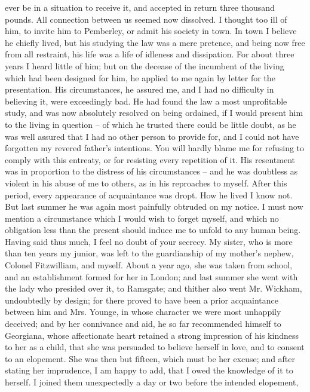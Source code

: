 \begin{letter}
ever be in a situation to receive it, and accepted in return
three thousand pounds. All connection between us
seemed now dissolved. I thought too ill of him, to invite
him to Pemberley, or admit his society in town. In town
I believe he chiefly lived, but his studying the law was
a mere pretence, and being now free from all restraint,
his life was a life of idleness and dissipation. For about
three years I heard little of him; but on the decease
of the incumbent of the living which had been designed
for him, he applied to me again by letter for the presentation.
His circumstances, he assured me, and I had no
difficulty in believing it, were exceedingly bad. He had
found the law a most unprofitable study, and was now
absolutely resolved on being ordained, if I would present
him to the living in question -- of which he trusted there
could be little doubt, as he was well assured that I had
no other person to provide for, and I could not have
forgotten my revered father’s intentions. You will hardly
blame me for refusing to comply with this entreaty, or
for resisting every repetition of it. His resentment was
in proportion to the distress of his circumstances -- and
he was doubtless as violent in his abuse of me to others,
as in his reproaches to myself. After this period, every
appearance of acquaintance was dropt. How he lived
I know not. But last summer he was again most painfully
obtruded on my notice. I must now mention a circumstance
which I would wish to forget myself, and which
no obligation less than the present should induce me to
unfold to any human being. Having said thus much,
I feel no doubt of your secrecy. My sister, who is more
than ten years my junior, was left to the guardianship of
my mother’s nephew, Colonel Fitzwilliam, and myself.
About a year ago, she was taken from school, and an
establishment formed for her in London; and last summer
she went with the lady who presided over it, to Ramsgate;
and thither also went Mr. Wickham, undoubtedly by
design; for there proved to have been a prior acquaintance
between him and Mrs. Younge, in whose character we
were most unhappily deceived; and by her connivance
and aid, he so far recommended himself to Georgiana,
whose affectionate heart retained a strong impression of
his kindness to her as a child, that she was persuaded to
believe herself in love, and to consent to an elopement.
She was then but fifteen, which must be her excuse; and
after stating her imprudence, I am happy to add, that
I owed the knowledge of it to herself. I joined them
unexpectedly a day or two before the intended elopement,

\end{letter}
